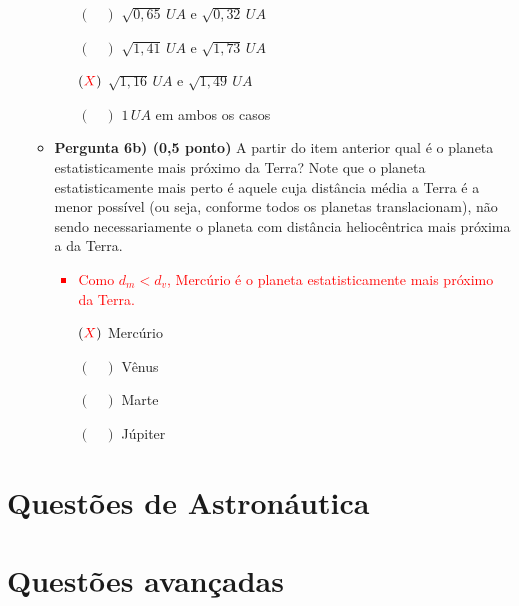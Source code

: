 \documentclass[a4paper, 12pt]{article}
\newcommand{\red}[1]{\textcolor{red}{#1}}
\begin{document}
\begin{flushleft}
\begin{itemize}
\begin{itemize}
{\begin{itemize}
                        \end{itemize}}
                        \begin{itemize}
                            \item[$(\quad)$] $\sqrt{0,65} \, UA$ e $\sqrt{0,32} \, UA$
                            \item[$(\quad)$] $\sqrt{1,41} \, UA$ e $\sqrt{1,73} \, UA$
                            \item[$(\red{X})$] $\sqrt{1,16} \, UA$ e $\sqrt{1,49} \, UA$
                            \item[$(\quad)$] $1 \, UA$ em ambos os casos
                        \end{itemize}
                    \item \textbf{Pergunta 6b) (0,5 ponto)} A partir do item anterior qual é o planeta estatisticamente mais próximo da Terra? Note que o planeta estatisticamente mais perto é aquele cuja distância média a Terra é a menor possível (ou seja, conforme todos os planetas translacionam), não sendo necessariamente o planeta com distância heliocêntrica mais próxima a da Terra.
                        \red{\begin{itemize}
                            \item Como $d_m<d_v$, Mercúrio é o planeta estatisticamente mais próximo da Terra.
                        \end{itemize}}
                        \begin{itemize}
                            \item[$(\red{X})$] Mercúrio
                            \item[$(\quad)$] Vênus
                            \item[$(\quad)$] Marte
                            \item[$(\quad)$] Júpiter
                        \end{itemize}
                \end{itemize}
        \end{itemize} \end{flushleft}
    \section*{Questões de Astronáutica}
    \section*{Questões avançadas}
\end{document}
